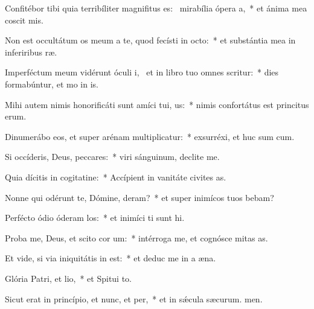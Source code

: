 \item Confitébor tibi quia terribíliter magnifitus es:~\pscross{} mirabília ópera a,~* et ánima mea coscit mis.
\item Non est occultátum os meum a te, quod fecísti in octo:~* et substántia mea in inferiribus ræ.
\item Imperféctum meum vidérunt óculi i,~\pscross{} et in libro tuo omnes scritur:~* dies formabúntur, et mo in is.
\item Mihi autem nimis honorificáti sunt amíci tui, us:~* nimis confortátus est princitus erum.
\item Dinumerábo eos, et super arénam multiplicatur:~* exsurréxi, et huc sum cum.
\item Si occíderis, Deus, peccares:~* viri sánguinum, declite  me.
\item Quia dícitis in cogitatine:~* Accípient in vanitáte civites as.
\item Nonne qui odérunt te, Dómine, deram?~* et super inimícos tuos bebam?
\item Perfécto ódio óderam los:~* et inimíci ti sunt hi.
\item Proba me, Deus, et scito cor um:~* intérroga me, et cognósce mitas as.
\item Et vide, si via iniquitátis in  est:~* et deduc me in a æna.
\item Glória Patri, et lio,~* et Spitui to.
\item Sicut erat in princípio, et nunc, et per,~* et in sǽcula sæcurum. men.
